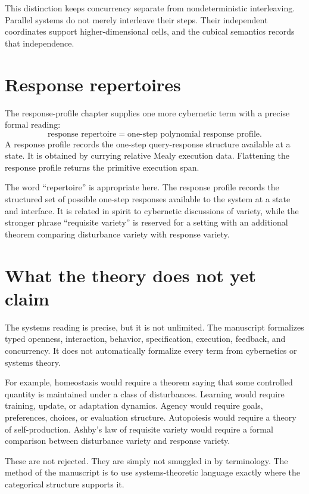 This distinction keeps concurrency separate from nondeterministic
interleaving.  Parallel systems do not merely interleave their steps.  Their
independent coordinates support higher-dimensional cells, and the cubical
semantics records that independence.

\section{Response repertoires}
\label{sec:response-repertoires}

The response-profile chapter supplies one more cybernetic term with a precise
formal reading:
\[
  \text{response repertoire}
  =
  \text{one-step polynomial response profile}.
\]
A response profile records the one-step query-response structure available at
a state.  It is obtained by currying relative Mealy execution data.  Flattening
the response profile returns the primitive execution span.

The word ``repertoire'' is appropriate here.  The response profile records the
structured set of possible one-step responses available to the system at a
state and interface.  It is related in spirit to cybernetic discussions of
variety, while the stronger phrase ``requisite variety'' is reserved for a
setting with an additional theorem comparing disturbance variety with response
variety.

\section{What the theory does not yet claim}
\label{sec:what-the-theory-does-not-yet-claim}

The systems reading is precise, but it is not unlimited.  The manuscript
formalizes typed openness, interaction, behavior, specification, execution,
feedback, and concurrency.  It does not automatically formalize every term
from cybernetics or systems theory.

For example, homeostasis would require a theorem saying that some controlled
quantity is maintained under a class of disturbances.  Learning would require
training, update, or adaptation dynamics.  Agency would require goals,
preferences, choices, or evaluation structure.  Autopoiesis would require a
theory of self-production.  Ashby's law of requisite variety would require a
formal comparison between disturbance variety and response variety.

These are not rejected.  They are simply not smuggled in by terminology.  The
method of the manuscript is to use systems-theoretic language exactly where
the categorical structure supports it.

